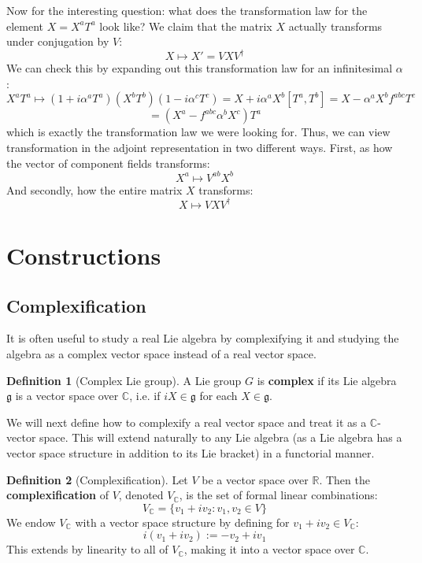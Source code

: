 \documentclass[11pt, oneside]{article}   	%
\theoremstyle{definition}
\newtheorem{definition}{Definition}[section]
\begin{document}
Now for the interesting question: what does the transformation law for the element $X = X^a T^a$ 
look like? We claim that the matrix $X$ actually transforms under conjugation by $V$:
\begin{equation}
	X\mapsto X' = VXV^\dagger
\end{equation}
We can check this by expanding out this transformation law for an infinitesimal $\alpha$:
$$
	X^a T^a\mapsto (1 + i\alpha^a T^a) (X^b T^b) (1 - i\alpha^c T^c) = X + i\alpha^a X^b [T^a, T^b]
	= X - \alpha^a X^bf^{abc}T^c 
$$
$$
	= (X^a - f^{abc}\alpha^b X^c)T^a
$$
which is exactly the transformation law we were looking for. Thus, we can view transformation in the 
adjoint representation in two different ways. First, as how the vector of component fields transforms:
\begin{equation}
	X^a\mapsto V^{ab} X^b
\end{equation}
And secondly, how the entire matrix $X$ transforms:
\begin{equation}
	X\mapsto VXV^\dagger
\end{equation}

\newpage
\section{Constructions}

\subsection{Complexification}

It is often useful to study a real Lie algebra by complexifying it and studying the algebra as a complex 
vector space instead of a real vector space. 
\begin{definition}[Complex Lie group]
	A Lie group $G$ is \textbf{complex} if its Lie algebra $\mathfrak g$ is a vector space over $\mathbb C$, 
	i.e. if $iX\in\mathfrak g$ for each $X\in\mathfrak g$. 
\end{definition}

We will next define how to complexify a real vector space and treat it as a $\mathbb C$-vector space. This 
will extend naturally to any Lie algebra (as a Lie algebra has a vector space structure in addition to its Lie 
bracket) in a functorial manner. 
\begin{definition}[Complexification]
	Let $V$ be a vector space over $\mathbb R$. Then the \textbf{complexification} of $V$, denoted $V_\mathbb{C}$, is the set of 
	formal linear combinations:
	\begin{equation}
		V_\mathbb{C} = \{v_1 + iv_2 : v_1, v_2\in V\}
	\end{equation}
	We endow $V_\mathbb{C}$ with a vector space structure by defining for $v_1 + iv_2\in V_\mathbb{C}$:
	\begin{equation}
		i(v_1 + iv_2) := -v_2 + iv_1
	\end{equation}
	This extends by linearity to all of $V_\mathbb{C}$, making it into a vector space over $\mathbb C$. 
\end{definition}
\end{document}
